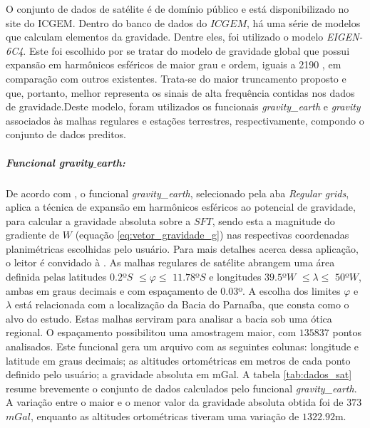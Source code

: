 O conjunto de dados de satélite é de domínio público e está disponibilizado no site do ICGEM. Dentro do banco de dados do $ICGEM$, há uma série de modelos que calculam elementos da gravidade. Dentre eles, foi utilizado o modelo \textit{EIGEN-6C4}. Este foi escolhido por se tratar do modelo de gravidade global que possui expansão em harmônicos esféricos de maior grau e ordem, iguais a 2190 \cite{eigen}, em comparação com outros existentes. Trata-se do maior truncamento proposto e que, portanto, melhor representa os sinais de alta frequência contidas nos dados de gravidade.Deste modelo, foram utilizados os funcionais \textit{gravity\_earth} e \textit{gravity} associados às malhas regulares e estações terrestres, respectivamente, compondo o conjunto de dados preditos.
\subparagraph{Funcional \textit{gravity$\_$earth}:} De acordo com , o funcional \textit{gravity\_earth}, selecionado pela aba \textit{Regular grids}, aplica a técnica de expansão em harmônicos esféricos ao potencial de gravidade, para calcular a gravidade absoluta sobre a $SFT$, sendo esta a magnitude do gradiente de $W$ (equação \ref{eq:vetor_gravidade_g}) nas respectivas coordenadas planimétricas escolhidas pelo usuário. Para mais detalhes acerca dessa aplicação, o leitor é convidado à . As malhas regulares de satélite abrangem uma área definida pelas latitudes $0.2$º$S$ $\leq \varphi \leq$ $11.78$º$S$ e longitudes $39.5$º$W$ $\leq \lambda \leq$ $50$º$W$, ambas em graus decimais e com espaçamento de $0.03$º. A escolha dos limites $\varphi$ e $\lambda$ está relacionada com a localização da Bacia do Parnaíba, que consta como o alvo do estudo. Estas malhas serviram para analisar a bacia sob uma ótica regional. O espaçamento possibilitou uma amostragem maior, com $135837$ pontos analisados. Este funcional gera um arquivo com as seguintes colunas: longitude e latitude em graus decimais; as altitudes ortométricas em metros de cada ponto definido pelo usuário; a gravidade absoluta em mGal. A tabela \ref*{tab:dados_sat} resume brevemente o conjunto de dados calculados pelo funcional \textit{gravity\_earth}. A variação entre o maior e o menor valor da gravidade absoluta obtida foi de $373$ $mGal$, enquanto as altitudes ortométricas tiveram uma variação de $1322.92$m. 

